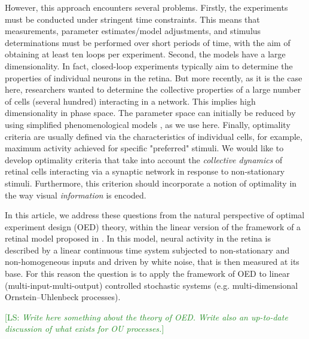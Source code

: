 \documentclass[twocolumn]{autart}
\newcommand{\LS}[1]{{\textcolor{ForestGreen}{[LS: \textit{#1}]}}}
\theoremstyle{definition}
\theoremstyle{remark}
\begin{document}
However, this approach encounters several problems. Firstly, the experiments must be conducted under stringent time constraints. This means that measurements, parameter estimates/model adjustments, and stimulus determinations must be performed over short periods of time, with the aim of obtaining at least ten loops per experiment. Second, the models have a large dimensionality. In fact, closed-loop experiments typically aim to determine the properties of individual neurons in the retina. But more recently, as it is the case here, researchers wanted to determine the collective properties of a large number of cells (several hundred) interacting in a network. This implies high dimensionality in phase space. The parameter space can initially be reduced by using simplified phenomenological models \cite{kartsaki-hilgen-etal:24}, as we use here. Finally, optimality criteria are usually defined via the characteristics of individual cells, for example, maximum activity achieved for specific "preferred" stimuli. We would like to develop optimality criteria that take into account the \textit{collective dynamics} of retinal cells interacting via a synaptic network in response to non-stationary stimuli. Furthermore, this criterion should incorporate a notion of optimality in the way visual \textit{information} is encoded.

In this article, we address these questions from the natural perspective of optimal experiment design (OED) theory, within the linear version of the framework of a retinal model proposed in \cite{kartsaki-hilgen-etal:24}. In this model, neural activity in the retina is described by a linear continuous time system subjected to non-stationary and non-homogeneous inputs and driven by white noise, that is then measured at its base. For this reason the question is to apply the framework of OED to linear (multi-input-multi-output) controlled stochastic systems (e.g. multi-dimensional Ornstein--Uhlenbeck processes).

\LS{Write here something about the theory of OED. Write also an up-to-date discussion of what exists for OU processes.}
\end{document}
